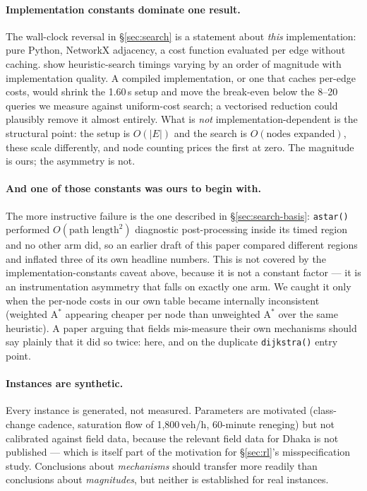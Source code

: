 \documentclass[11pt]{article}
\begin{document}
\paragraph{Implementation constants dominate one result.} The wall-clock reversal in
\S\ref{sec:search} is a statement about \emph{this} implementation: pure Python, NetworkX
adjacency, a cost function evaluated per edge without caching. \citet{burns2012implementing} show
heuristic-search timings varying by an order of magnitude with implementation quality. A compiled
implementation, or one that caches per-edge costs, would shrink the 1.60\,s setup and move the
break-even below the 8--20 queries we measure against uniform-cost search; a vectorised reduction
could plausibly remove it almost entirely. What is \emph{not} implementation-dependent is the structural point: the setup is
$O(|E|)$ and the search is $O(\text{nodes expanded})$, these scale differently, and node counting
prices the first at zero. The magnitude is ours; the asymmetry is not.

\paragraph{And one of those constants was ours to begin with.} The more instructive failure is the
one described in \S\ref{sec:search-basis}: \texttt{astar()} performed $O(\text{path length}^2)$
diagnostic post-processing inside its timed region and no other arm did, so an earlier draft of
this paper compared different regions and inflated three of its own headline numbers. This is not
covered by the implementation-constants caveat above, because it is not a constant factor --- it is
an instrumentation asymmetry that falls on exactly one arm. We caught it only when the per-node
costs in our own table became internally inconsistent (weighted $\mathrm{A}^*$ appearing cheaper
per node than unweighted $\mathrm{A}^*$ over the same heuristic). A paper arguing that fields
mis-measure their own mechanisms should say plainly that it did so twice: here, and on the
duplicate \texttt{dijkstra()} entry point.

\paragraph{Instances are synthetic.} Every instance is generated, not measured. Parameters are
motivated (class-change cadence, saturation flow of 1,800\,veh/h, 60-minute reneging) but not
calibrated against field data, because the relevant field data for Dhaka is not published --- which
is itself part of the motivation for \S\ref{sec:rl}'s misspecification study. Conclusions about
\emph{mechanisms} should transfer more readily than conclusions about \emph{magnitudes}, but
neither is established for real instances.
\end{document}
